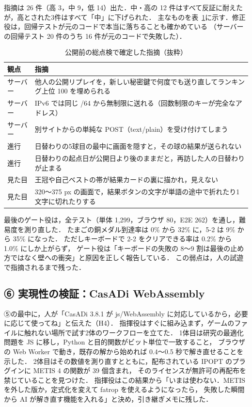 \documentclass[a4paper,10pt]{ltjsarticle}
\newcommand{\tabref}[1]{表~\ref{#1}}
\begin{document}
指摘は 26 件（高 3，中 9，低 14）出た．中・高の 12 件はすべて反証に耐えたが，高とされた3件はすべて「中」に下げられた．
主なものを\tabref{tab:findings}に示す．修正役は，回帰テストが元のコードで本当に落ちることも確かめている
（サーバーの回帰テスト 20 件のうち 16 件が元のコードで失敗した）．

\begin{table}[H]
\centering
\caption{公開前の総点検で確定した指摘（抜粋）}
\label{tab:findings}
\small
\begin{tabularx}{\linewidth}{lX}
\toprule
観点 & 指摘 \\
\midrule
サーバー & 他人の公開リプレイを，新しい秘密鍵で何度でも送り直してランキング上位 100 を埋められる \\
サーバー & IPv6 では同じ /64 から無制限に送れる（回数制限のキーが完全なアドレス） \\
サーバー & 別サイトからの単純な POST（text/plain）を受け付けてしまう \\
進行 & 日替わりの5球目の最中に画面を隠すと，その球の結果が送られない \\
進行 & 日替わりの起点日が公開日より後のままだと，再訪した人の日替わりが止まる \\
見た目 & 王冠や自己ベストの帯が結果カードの裏に描かれ，見えない \\
見た目 & 320〜375 px の画面で，結果ボタンの文字が単語の途中で折れたり1文字に切れたりする \\
\bottomrule
\end{tabularx}
\end{table}

最後のゲート役は，全テスト（単体 1,299，ブラウザ 80，E2E 262）を通し，難易度を測り直した．
たまごの銅メダル到達率は 0\% から 32\% に，5-2 は 9\% から 35\% になった．
ただしキーボードで 2-2 をクリアできる率は 0.2\% から 1.0\% にしか上がらず，
ゲート役は「キーボードの失敗の 8〜9 割は最後の止め方ではなく壁への衝突」と原因を正しく報告している．
この弱点は，人の試遊で指摘されるまで残った．

\subsection{⑥ 実現性の検証：CasADi WebAssembly}

⑤の最中に，人が「CasADi 3.8.1 が js/WebAssembly に対応しているから，必要に応じて使ってね」と伝えた（H4）．
指揮役はすぐに組み込まず，ゲームのファイルに触れない場所で試す2体のワークフローを立てた．
1体目は研究の最適化問題を JS に移し，Python と目的関数がビット単位で一致すること，
ブラウザの Web Worker で動き，既存の解から始めれば 0.4〜0.5 秒で解き直せることを示した．
2体目はその数値を測り直すとともに，配布されている IPOPT のプラグインに METIS 4 の関数が 39 個含まれ，
そのライセンスが無許可の再配布を禁じていることを見つけた．
指揮役はこの結果から「いまは使わない．METIS を外した版か，定式化を変えて fatrop を使えるようになったら，
失敗した瞬間から AI が解き直す機能を入れる」と決め，引き継ぎメモに残した．
\end{document}
